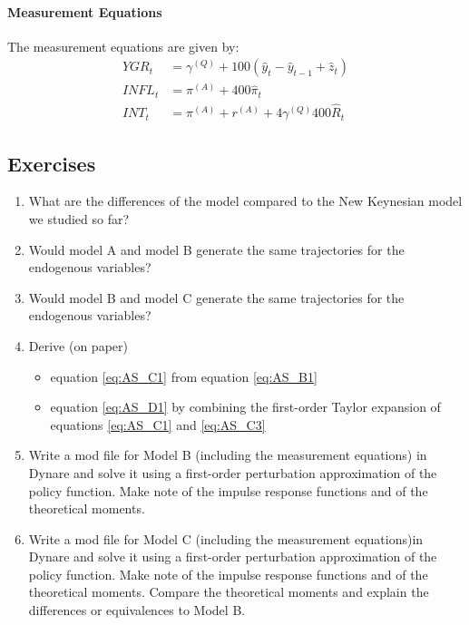 \paragraph{Measurement Equations}
The measurement equations are given by:
\begin{align}
YGR_t &= \gamma^{(Q)} + 100(\hat{y}_t-\hat{y}_{t-1} + \hat{z}_t)
\\
INFL_t &= \pi^{(A)} + 400 \hat{\pi}_t
\\
INT_t &= \pi^{(A)} + r^{(A)} + 4 \gamma^{(Q)} 400 \hat{R}_t
\end{align}

\subsection*{Exercises}
\begin{enumerate}
\item What are the differences of the model compared to the New Keynesian model we studied so far?

\item Would model A and model B generate the same trajectories for the endogenous variables?
  
\item Would model B and model C generate the same trajectories for the endogenous variables?
  
\item Derive (on paper)
\begin{itemize}
    \item equation \eqref{eq:AS_C1} from equation \eqref{eq:AS_B1}
    \item equation \eqref{eq:AS_D1} by combining the first-order Taylor expansion of equations \eqref{eq:AS_C1} and \eqref{eq:AS_C3}
\end{itemize}

\item Write a mod file for Model B (including the measurement equations) in Dynare
  and solve it using a first-order perturbation approximation of the policy function.
Make note of the impulse response functions and of the theoretical moments.

\item Write a mod file for Model C (including the measurement equations)in Dynare
  and solve it using a first-order perturbation approximation of the policy function.
Make note of the impulse response functions and of the theoretical moments.
Compare the theoretical moments and explain the differences or equivalences to Model B.
  

\end{enumerate}
